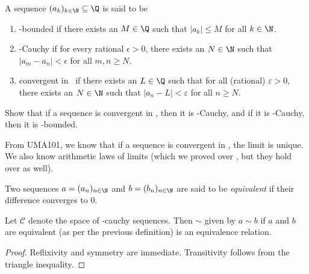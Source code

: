 \begin{definition}
    A sequence $(a_k)_{k \in \N} \subseteq \Q$ is said to be
    \begin{enumerate}
        \item \Q-bounded if there exists an $M \in \Q$ such that
        $|a_k| \le M$ for all $k \in \N$.
        \item \Q-Cauchy if for every rational $\epsilon > 0$, there exists
        an $N \in \N$ such that $|a_m - a_n| < \epsilon$ for all
        $m, n \ge N$.
        \item convergent in \Q\ if there exists an $L \in \Q$ such that
        for all (rational) $\varepsilon > 0$, there exists an $N \in \N$
        such that $|a_n - L| < \varepsilon$ for all $n \ge N$.
    \end{enumerate}
\end{definition}

\begin{exercise}
    Show that if a sequence is convergent in \Q, then it is \Q-Cauchy,
    and if it is \Q-Cauchy, then it is \Q-bounded.
\end{exercise}
\begin{remark}
    From UMA101, we know that if a sequence is convergent in \Q, the limit
    is unique.
    We also know arithmetic laws of limits (which we proved over \R, but
    they hold over \Q as well).
\end{remark}

\begin{definition}
    Two sequences $a = (a_n)_{n \in \N}$ and $b = (b_n)_{n \in \N}$ are said
    to be \emph{equivalent} if their difference converges to $0$.
\end{definition}

\begin{proposition}
    Let $\mathcal{C}$ denote the space of \Q-cauchy sequences.
    Then $\sim$ given by $a \sim b$ if $a$ and $b$ are equivalent (as per
    the previous definition) is an equivalence relation.
\end{proposition}
\begin{proof}
    Reflixivity and symmetry are immediate.
    Transitivity follows from the triangle inequality.
\end{proof}

